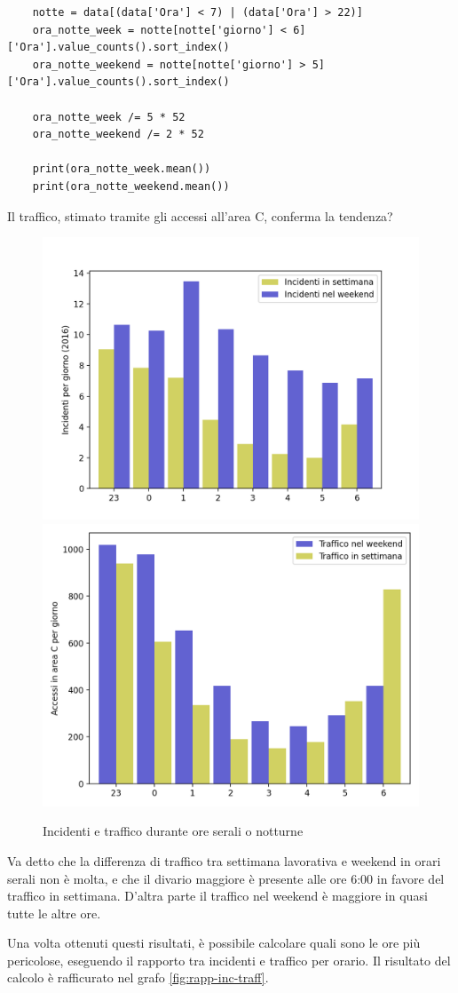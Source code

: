 \documentclass[a4paper]{report}
\begin{document}
\begin{lstlisting}
    notte = data[(data['Ora'] < 7) | (data['Ora'] > 22)]
    ora_notte_week = notte[notte['giorno'] < 6]['Ora'].value_counts().sort_index()
    ora_notte_weekend = notte[notte['giorno'] > 5]['Ora'].value_counts().sort_index()

    ora_notte_week /= 5 * 52 
    ora_notte_weekend /= 2 * 52

    print(ora_notte_week.mean())
    print(ora_notte_weekend.mean())
\end{lstlisting}

Il traffico, stimato tramite gli accessi all'area C, conferma la tendenza?

\begin{figure}
    \includegraphics[width=0.5\linewidth]{../src/incidenti/incidenti_senza_coords/ore_punta/ore_notte.png}
    \includegraphics[width=0.48\linewidth]{../src/area_c/traffico_serale.png}
    \caption{Incidenti e traffico durante ore serali o notturne}
    \label{fig:ore-notte}
\end{figure}

Va detto che la differenza di traffico tra settimana lavorativa e weekend in orari serali non è molta, 
e che il divario maggiore è presente alle ore 6:00 in favore del traffico in settimana.
D'altra parte il traffico nel weekend è maggiore in quasi tutte le altre ore.

Una volta ottenuti questi risultati,  è possibile calcolare quali sono le ore più pericolose, 
eseguendo il rapporto tra incidenti e traffico per orario.
Il risultato del calcolo è rafficurato nel grafo \ref{fig:rapp-inc-traff}.
\end{document}
